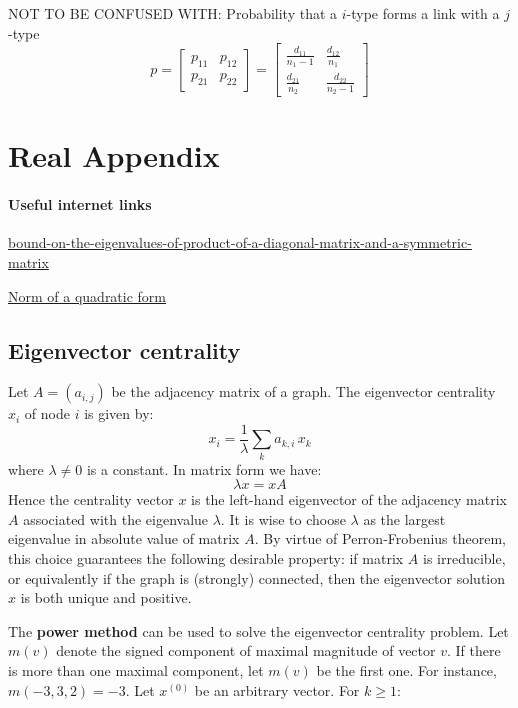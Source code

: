 \documentclass[12pt]{article}
\begin{document}
NOT TO BE CONFUSED WITH: Probability that a $i$-type forms a link with a $j$-type
\begin{equation*} 
p=\begin{bmatrix} p_{11} & p_{12} \\ p_{21} & p_{22} \end{bmatrix} = 
\begin{bmatrix} \frac{d_{11}}{n_1-1} & \frac{d_{12}}{n_1} \\ \frac{d_{21}}{n_2} & \frac{d_{22}}{n_2-1} \end{bmatrix}
\end{equation*}


\section{Real Appendix}
\paragraph{Useful internet links}

\href{https://math.stackexchange.com/questions/2637102/bound-on-the-eigenvalues-of-product-of-a-diagonal-matrix-and-a-symmetric-matrix}{bound-on-the-eigenvalues-of-product-of-a-diagonal-matrix-and-a-symmetric-matrix}

\href{https://math.stackexchange.com/questions/140604/norm-of-a-quadratic-form}{Norm of a quadratic form}

\subsection{Eigenvector centrality}

Let $A = (a_{i,j})$ be the adjacency matrix of a graph. The eigenvector centrality $x_{i}$ of node $i$ is given by: $$x_i = \frac{1}{\lambda} \sum_k a_{k,i} \, x_k$$ where $\lambda \neq 0$ is a constant. In matrix form we have: $$\lambda x = x A$$
Hence the centrality vector $x$ is the left-hand eigenvector of the adjacency matrix $A$ associated with the eigenvalue $\lambda$. It is wise to choose $\lambda$ as the largest eigenvalue in absolute value of matrix $A$. By virtue of Perron-Frobenius theorem, this choice guarantees the following desirable property: if matrix $A$ is irreducible, or equivalently if the graph is (strongly) connected, then the eigenvector solution $x$ is both unique and positive.

\bigskip

The \textbf{power method} can be used to solve the eigenvector centrality problem. Let $m(v)$ denote the signed component of maximal magnitude of vector $v$. If there is more than one maximal component, let $m(v)$ be the first one. For instance, $m(-3,3,2) = -3$. Let $x^{(0)}$ be an arbitrary vector. For $k \geq 1$:
\end{document}
